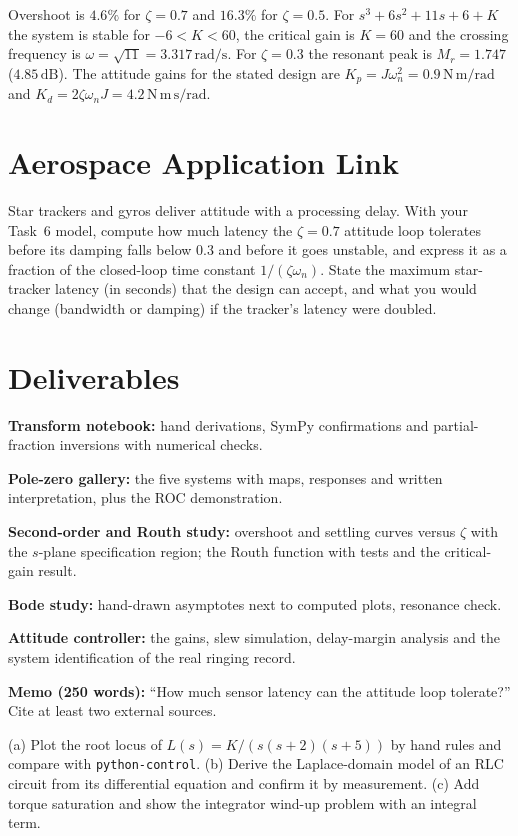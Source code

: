 \documentclass[11pt,a4paper]{article}
\begin{document}
\begin{checkpoint}
Overshoot is $4.6\%$ for $\zeta=0.7$ and $16.3\%$ for $\zeta=0.5$. For $s^3+6s^2+11s+6+K$ the system is stable for $-6<K<60$, the critical gain is $K=60$ and the crossing frequency is $\omega=\sqrt{11}=3.317\,\mathrm{rad/s}$. For $\zeta=0.3$ the resonant peak is $M_r=1.747$ ($4.85\,\mathrm{dB}$). The attitude gains for the stated design are $K_p=J\omega_n^2=0.9\,\mathrm{N\,m/rad}$ and $K_d=2\zeta\omega_nJ=4.2\,\mathrm{N\,m\,s/rad}$.
\end{checkpoint}

\section*{Aerospace Application Link}
Star trackers and gyros deliver attitude with a processing delay. With your Task~6 model, compute how much latency the $\zeta=0.7$ attitude loop tolerates before its damping falls below $0.3$ and before it goes unstable, and express it as a fraction of the closed-loop time constant $1/(\zeta\omega_n)$. State the maximum star-tracker latency (in seconds) that the design can accept, and what you would change (bandwidth or damping) if the tracker's latency were doubled.

\section*{Deliverables}
\begin{delivs}
  \item[D1] \textbf{Transform notebook:} hand derivations, SymPy confirmations and partial-fraction inversions with numerical checks.
  \item[D2] \textbf{Pole-zero gallery:} the five systems with maps, responses and written interpretation, plus the ROC demonstration.
  \item[D3] \textbf{Second-order and Routh study:} overshoot and settling curves versus $\zeta$ with the $s$-plane specification region; the Routh function with tests and the critical-gain result.
  \item[D4] \textbf{Bode study:} hand-drawn asymptotes next to computed plots, resonance check.
  \item[D5] \textbf{Attitude controller:} the gains, slew simulation, delay-margin analysis and the system identification of the real ringing record.
  \item[D6] \textbf{Memo (250 words):} ``How much sensor latency can the attitude loop tolerate?'' Cite at least two external sources.
  \item[Bonus] (a) Plot the root locus of $L(s)=K/(s(s+2)(s+5))$ by hand rules and compare with \texttt{python-control}. (b) Derive the Laplace-domain model of an RLC circuit from its differential equation and confirm it by measurement. (c) Add torque saturation and show the integrator wind-up problem with an integral term.
\end{delivs}
\end{document}

